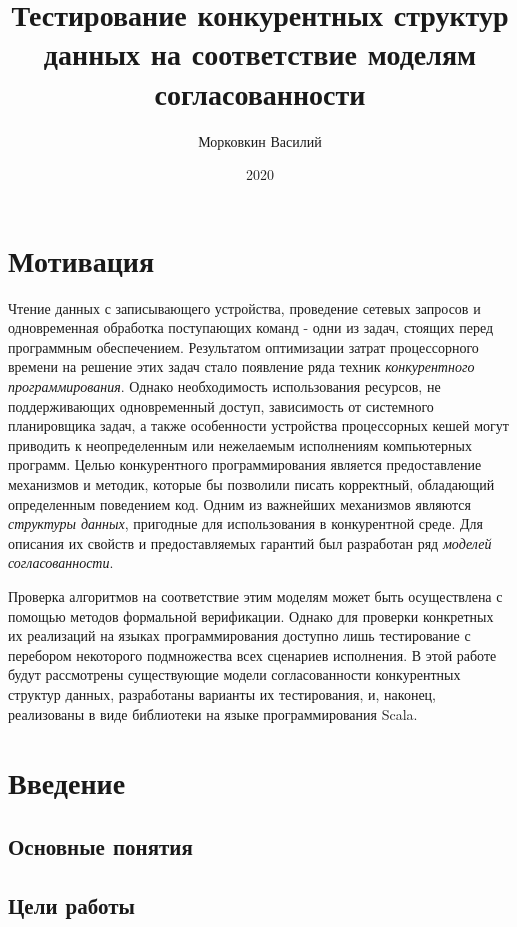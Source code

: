 \documentclass[14pt, openany]{book}
\title{Тестирование конкурентных структур данных на соответствие моделям согласованности}
\author{Морковкин Василий}
\date{2020}
\begin{document}
\maketitle
\chapter*{Мотивация}
\par
Чтение данных с записывающего устройства, проведение сетевых запросов и одновременная обработка поступающих команд - одни из задач, стоящих перед программным обеспечением. Результатом оптимизации затрат процессорного времени на решение этих задач стало появление ряда техник  \textit{конкурентного программирования}. Однако необходимость использования ресурсов, не поддерживающих одновременный доступ, зависимость от системного планировщика задач, а также особенности устройства процессорных кешей могут приводить к неопределенным или нежелаемым исполнениям компьютерных программ. Целью конкурентного программирования является предоставление механизмов и методик, которые бы позволили писать корректный, обладающий определенным поведением код. Одним из важнейших механизмов являются \textit{структуры данных}, пригодные для использования в конкурентной среде. Для описания их свойств и предоставляемых гарантий был разработан ряд \textit{моделей согласованности}. \par
Проверка алгоритмов на соответствие этим моделям может быть осуществлена с помощью методов формальной верификации. Однако для проверки конкретных их реализаций на языках программирования доступно лишь тестирование с перебором некоторого подмножества всех сценариев исполнения. В этой работе будут рассмотрены существующие модели согласованности конкурентных структур данных, разработаны варианты их тестирования, и, наконец, реализованы в виде библиотеки на языке программирования Scala.
\setcounter{page}{1}
\tableofcontents
\clearpage

\chapter{Введение}

\section{Основные понятия}

\section{Цели работы}
\end{document}
